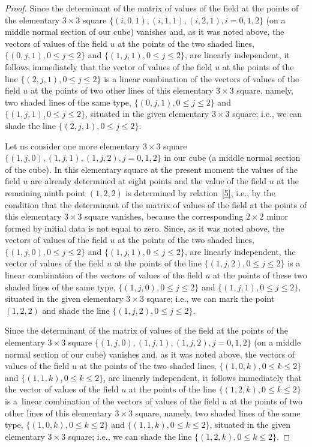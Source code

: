\begin{proof}
Since the determinant of the matrix of values of the f\/ield at the
points of the elementary $3 \times 3$ square $\{(i, 0, 1), (i, 1,
1), (i, 2, 1), i = 0, 1, 2\}$ (on a middle normal section of our
cube) vanishes and, as it was noted above, the vectors of values of
the f\/ield $u$ at the points of the two shaded lines, $\{(0, j, 1), 0
\leq j \leq 2\}$ and $\{(1, j, 1), 0 \leq j \leq 2\}$, are linearly
independent, it follows immediately that the vector of values of the
f\/ield $u$ at the points of the line $\{(2, j, 1), 0 \leq j \leq 2\}$
is a linear combination of the vectors of values of the f\/ield $u$ at
the points of two other lines of this elementary $3 \times 3$
square, namely, two shaded lines of the same type, $\{(0, j, 1), 0
\leq j \leq 2\}$ and $\{(1, j, 1), 0 \leq j \leq 2\}$, situated in
the given elementary $3 \times 3$ square; i.e., we can shade the
line $\{(2, j, 1), 0 \leq j \leq 2\}$.


Let us consider one more elementary $3 \times 3$ square $\{(1, j,
0), (1, j, 1), (1, j, 2), j = 0, 1, 2\}$ in our cube (a middle
normal section of the cube). In this elementary square at the
present moment the values of the f\/ield $u$ are already determined at
eight points and the value of the f\/ield $u$ at the remaining ninth
point $(1, 2, 2)$ is determined by relation~\eqref{5}, i.e.,
by the condition that the determinant of the matrix of values of the
f\/ield at the points of this elementary $3 \times 3$ square vanishes,
because the corresponding $2 \times 2$ minor formed by initial data
is not equal to zero. Since, as it was noted above, the vectors of
values of the f\/ield $u$ at the points of the two shaded lines,
$\{(1, j, 0), 0 \leq j \leq 2\}$ and $\{(1, j, 1), 0 \leq j \leq
2\}$, are linearly independent, the vector of values of the f\/ield
$u$ at the points of the line $\{(1, j, 2), 0 \leq j \leq 2\}$ is a
linear combination of the vectors of values of the f\/ield $u$ at the
points of these two shaded lines of the same type, $\{(1, j, 0), 0
\leq j \leq 2\}$ and $\{(1, j, 1), 0 \leq j \leq 2\}$, situated in
the given elementary $3 \times 3$ square; i.e., we can mark the
point $(1, 2, 2)$ and shade the line $\{(1, j, 2), 0 \leq j \leq
2\}$.


Since the determinant of the matrix of values of the f\/ield at the
points of the elementary $3 \times 3$ square $\{(1, j, 0), (1, j,
1), (1, j, 2), j = 0, 1, 2\}$ (on a middle normal section of our
cube) vanishes and, as it was noted above, the vectors of values of
the f\/ield $u$ at the points of the two shaded lines, $\{(1, 0, k), 0
\leq k \leq 2\}$ and $\{(1, 1, k), 0 \leq k \leq 2\}$, are linearly
independent, it follows immediately that the vector of values of the
f\/ield $u$ at the points of the line $\{(1, 2, k), 0 \leq k \leq 2\}$
is a~linear combination of the vectors of values of the f\/ield $u$ at
the points of two other lines of this elementary $3 \times 3$
square, namely, two shaded lines of the same type, $\{(1, 0, k), 0
\leq k \leq 2\}$ and $\{(1, 1, k), 0 \leq k \leq 2\}$, situated in
the given elementary $3 \times 3$ square; i.e., we can shade the
line $\{(1, 2, k), 0 \leq k \leq 2\}$.



\end{proof}
